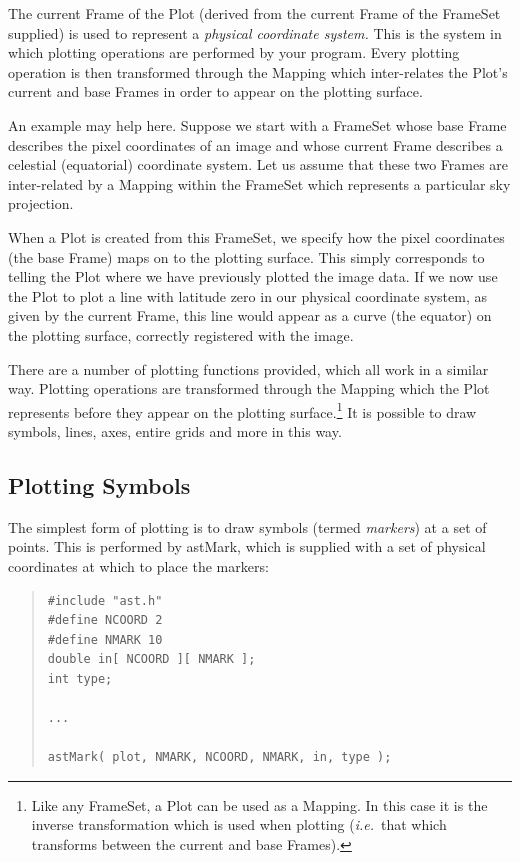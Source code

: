 \documentclass[twoside,11pt]{article}
\newcommand{\htmlref}[2]{#1}
\begin{document}
The current Frame of the Plot (derived from the current Frame of the
FrameSet supplied) is used to represent a {\em{physical coordinate
system.}} This is the system in which plotting operations are
performed by your program.  Every plotting operation is then
transformed through the \htmlref{Mapping}{Mapping} which inter-relates the Plot's current
and base Frames in order to appear on the plotting surface.

An example may help here. Suppose we start with a FrameSet whose base
Frame describes the pixel coordinates of an image and whose current
Frame describes a celestial (equatorial) coordinate system. Let us
assume that these two Frames are inter-related by a Mapping within the
FrameSet which represents a particular sky projection.

When a Plot is created from this FrameSet, we specify how the pixel
coordinates (the base Frame) maps on to the plotting surface. This
simply corresponds to telling the Plot where we have previously
plotted the image data. If we now use the Plot to plot a line with
latitude zero in our physical coordinate system, as given by the
current Frame, this line would appear as a curve (the equator) on the
plotting surface, correctly registered with the image.

There are a number of plotting functions provided, which all work in a
similar way. Plotting operations are transformed through the Mapping
which the Plot represents before they appear on the plotting
surface.\footnote{Like any FrameSet, a Plot can be used as a
Mapping. In this case it is the inverse transformation which is used
when plotting ({\em{i.e.}}\ that which transforms between the current
and base Frames).}  It is possible to draw symbols, lines, axes,
entire grids and more in this way.


\subsection{Plotting Symbols}

The simplest form of plotting is to draw symbols (termed
{\em{markers}}) at a set of points. This is performed by \htmlref{astMark}{astMark},
which is supplied with a set of physical coordinates at which to place
the markers:

\begin{quote}
\small
\begin{verbatim}
#include "ast.h"
#define NCOORD 2
#define NMARK 10
double in[ NCOORD ][ NMARK ];
int type;

...

astMark( plot, NMARK, NCOORD, NMARK, in, type );
\end{verbatim}
\normalsize
\end{quote}
\end{document}
